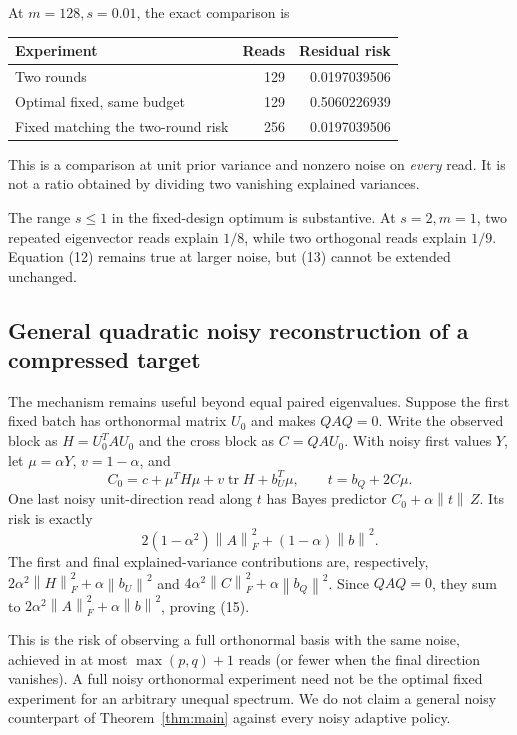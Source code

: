 \documentclass[11pt,a4paper]{article}
\newcommand{\tr}{\operatorname{tr}}\newcommand{\rank}{\operatorname{rank}}
\newcommand{\norm}[1]{\left\lVert#1\right\rVert}
\begin{document}
At $m=128,s=0.01$, the exact comparison is
\begin{center}
\begin{tabular}{lrr}\toprule
Experiment & Reads & Residual risk\\\midrule
Two rounds &129&0.0197039506\\
Optimal fixed, same budget &129&0.5060226939\\
Fixed matching the two-round risk &256&0.0197039506\\\bottomrule
\end{tabular}
\end{center}
This is a comparison at unit prior variance and nonzero noise on \emph{every} read. It is not a ratio obtained by dividing two vanishing explained variances.

The range $s\le1$ in the fixed-design optimum is substantive. At $s=2,m=1$, two repeated eigenvector reads explain $1/8$, while two orthogonal reads explain $1/9$. Equation (12) remains true at larger noise, but (13) cannot be extended unchanged.

\subsection{General quadratic noisy reconstruction of a compressed target}

The mechanism remains useful beyond equal paired eigenvalues. Suppose the first fixed batch has orthonormal matrix $U_0$ and makes $QAQ=0$. Write the observed block as $H=U_0^TAU_0$ and the cross block as $C=QAU_0$. With noisy first values $Y$, let $\mu=\alpha Y$, $v=1-\alpha$, and
\[
 C_0=c+\mu^TH\mu+v\tr H+b_U^T\mu,
 \qquad t=b_Q+2C\mu.
\]
One last noisy unit-direction read along $t$ has Bayes predictor $C_0+\alpha\norm t\,Z$. Its risk is exactly
\[
 2(1-\alpha^2)\norm A_F^2+(1-\alpha)\norm b^2. \tag{15}
\]
The first and final explained-variance contributions are, respectively,
$2\alpha^2\norm H_F^2+\alpha\norm{b_U}^2$ and
$4\alpha^2\norm C_F^2+\alpha\norm{b_Q}^2$.
Since $QAQ=0$, they sum to $2\alpha^2\norm A_F^2+\alpha\norm b^2$, proving (15).

This is the risk of observing a full orthonormal basis with the same noise, achieved in at most $\max(p,q)+1$ reads (or fewer when the final direction vanishes). A full noisy orthonormal experiment need not be the optimal fixed experiment for an arbitrary unequal spectrum. We do not claim a general noisy counterpart of Theorem~\ref{thm:main} against every noisy adaptive policy.
\end{document}
